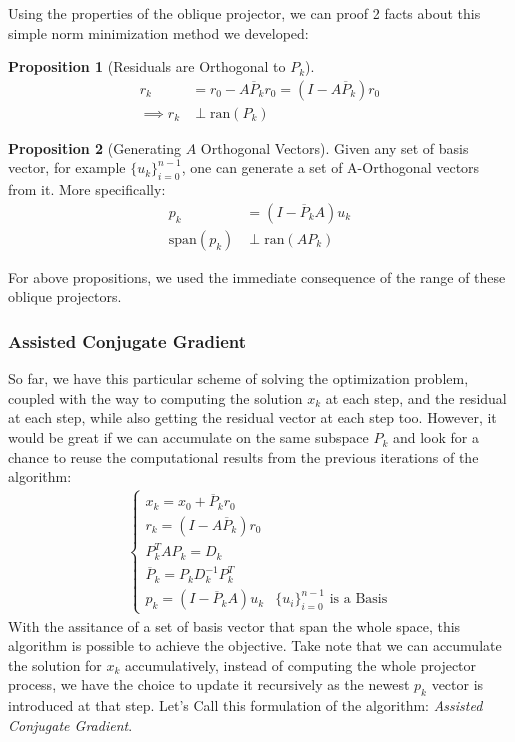 \documentclass[]{article}
\theoremstyle{definition}
\newtheorem{prop}{Proposition}[section]  %
\begin{document}
            Using the properties of the oblique projector, we can proof 2 facts about this simple norm minimization method we developed: 
            \begin{prop}[Residuals are Orthogonal to $P_k$]
                \begin{align}
                    r_k &= r_0 - A\overline{P}_kr_0 = (I - A\overline{P}_k)r_0
                    \\
                    \implies 
                    r_k &\perp \text{ran}(P_k)
                \end{align}
            \end{prop}
            \begin{prop}[Generating $A$ Orthogonal Vectors]
                Given any set of basis vector, for example $\{u_k\}_{i = 0}^{n - 1}$, one can generate a set of A-Orthogonal vectors from it. More specifically: 
                \begin{align}
                    p_k &= (I - \overline{P}_kA)u_k
                    \\
                    \text{span}(p_k) &\perp \text{ran}(AP_k)
                \end{align}
            \end{prop}
            For above propositions, we used the immediate consequence of the range of these oblique projectors. 
        \subsubsection{Assisted Conjugate Gradient}
            So far, we have this particular scheme of solving the optimization problem, coupled with the way to computing the solution $x_k$ at each step, and the residual at each step, while also getting the residual vector at each step too. However, it would be great if we can accumulate on the same subspace $P_k$ and look for a chance to reuse the computational results from the previous iterations of the algorithm: 
            \begin{align}
                \begin{cases}
                    x_k = x_0 + \overline{P}_k r_0
                    \\
                    r_k = (I - A\overline{P}_k) r_0
                    \\
                    P^T_kAP_k = D_k
                    \\
                    \overline{P}_k = P_kD^{-1}_kP_k^T
                    \\
                    p_k = (I - \overline{P}_kA)u_k & \{u_i\}_{i = 0}^{n - 1} \text{ is a Basis}
                \end{cases}
            \end{align}
            With the assitance of a set of basis vector that span the whole space, this algorithm is possible to achieve the objective. Take note that we can accumulate the solution for $x_k$ accumulatively, instead of computing the whole projector process, we have the choice to update it recursively as the newest $p_k$ vector is introduced at that step. Let's Call this formulation of the algorithm: \textit{Assisted Conjugate Gradient}. 
\end{document}
